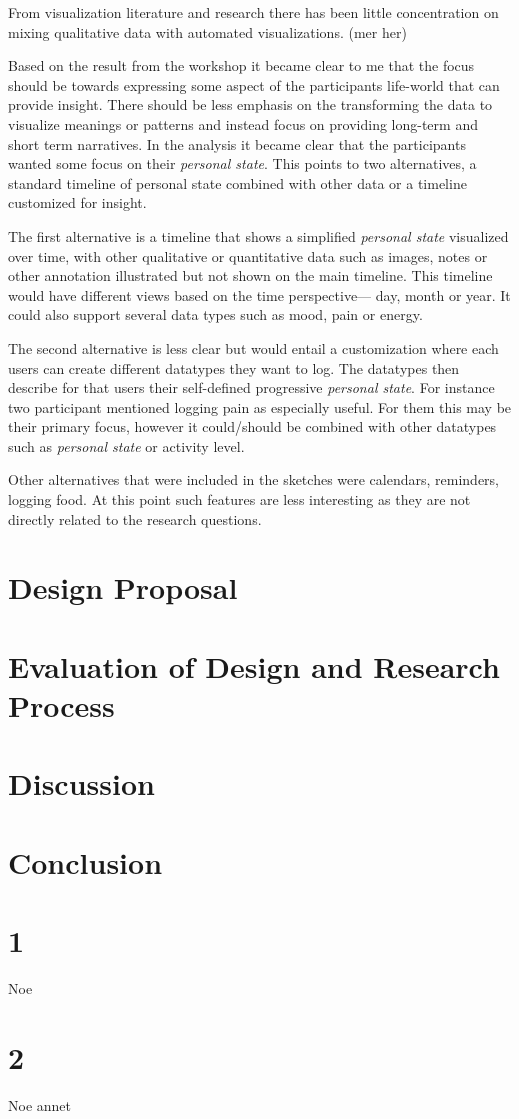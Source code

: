 \documentclass[UKenglish]{uiophd}
\begin{document}
		From visualization literature and research there has been little concentration on mixing qualitative data with automated visualizations. (mer her)

		Based on the result from the workshop it became clear to me that the focus should be towards expressing some aspect of the participants life-world that can provide insight. There should be less emphasis on the transforming the data to visualize meanings or patterns and instead focus on providing long-term and short term narratives. In the analysis it became clear that the participants wanted some focus on their \textit{personal state}. 
		This points to two alternatives, a standard timeline of personal state combined with other data or a timeline customized for insight. 

		The first alternative is a timeline that shows a simplified \textit{personal state} visualized over time, with other qualitative or quantitative data such as images, notes or other annotation illustrated but not shown on the main timeline. This timeline would have different views based on the time perspective--- day, month or year. It could also support several data types such as mood, pain or energy.

		The second alternative is less clear but would entail a customization where each users can create different datatypes they want to log. The datatypes then describe for that users their self-defined progressive \textit{personal state}. For instance two participant mentioned logging pain as especially useful. For them this may be their primary focus, however it could/should be combined with other datatypes such as \textit{personal state} or activity level. 

		Other alternatives that were included in the sketches were calendars, reminders, logging food. At this point such features are less interesting as they are not directly related to the research questions. 

\chapter{Design Proposal}
\chapter{Evaluation of Design and Research Process}
\chapter{Discussion}
\chapter{Conclusion}
\backmatter
%

\clearpage

\printbibliography
{}

\appendix
\chapter{1}
Noe
\chapter{2}
Noe annet
\end{document}
